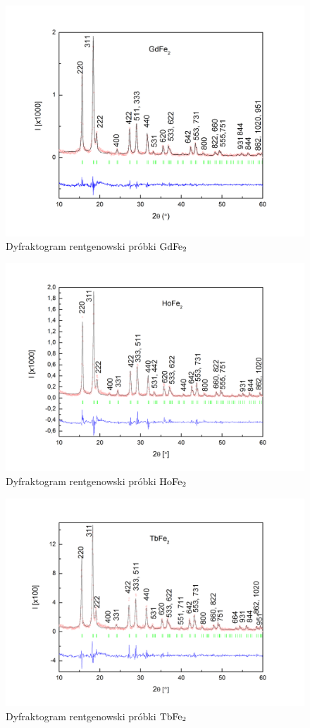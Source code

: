 \documentclass[a4paper,12pt]{article}
\numberwithin{equation}{section}
\newcommand{\nit}[1]{\textnormal{#1}}
\begin{document}
\newpage
\begin{figure}
  \centering
  \includegraphics[width=0.8\linewidth]{../img/dif/GdFe2rentgen}
  \caption{Dyfraktogram rentgenowski próbki $\nit{Gd}\nit{Fe}_2$}
  \label{Gdrentgen}
\end{figure}

\newpage
\begin{figure}
  \centering
  \includegraphics[width=0.85\linewidth]{../img/dif/HoFe2rentger}
  \caption{Dyfraktogram rentgenowski próbki $\nit{Ho}\nit{Fe}_2$}
  \label{Horentgen}
\end{figure}

\newpage
\begin{figure}
  \centering
  \includegraphics[width=0.85\linewidth]{../img/dif/TbFe2rentgen}
  \caption{Dyfraktogram rentgenowski próbki $\nit{Tb}\nit{Fe}_2$}
  \label{Tbrentgen}
\end{figure}
\end{document}
